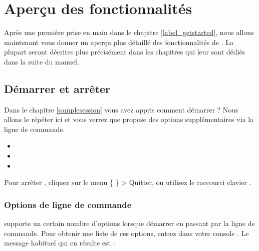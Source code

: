 \chapter{Aperçu des fonctionnalités}\label{feature_glance}

Après une première prise en main dans le chapitre \ref{label_getstarted}, nous allons maintenant vous donner un aperçu plus détaillé des fonctionnalités de \qg. La plupart seront décrites plus précisément dans les chapitres qui leur sont dédiés dans la suite du manuel.

\section{Démarrer et arrêter \qg}\label{label_starting}

Dans le chapitre \ref{samplesession} vous avez appris comment démarrer \qg ? Nous allons le répéter ici et vous verrez que \qg propose des options supplémentaires via la ligne de commande.

\begin{itemize}[label=--]
\item {} 
\item {}
\item {}
\end{itemize} 

Pour arrêter \qg, cliquez sur le menu \{\nix{} \osx{\qg}\} > Quitter, ou utilisez le raccourci clavier .

\subsection{Options de ligne de commande}
\label{label_commandline}

\nix \qg supporte un certain nombre d'options lorsque démarrer en passant par la ligne de commande. Pour obtenir une liste de ces options, entrez dans votre console . Le message habituel qui en résulte est :

